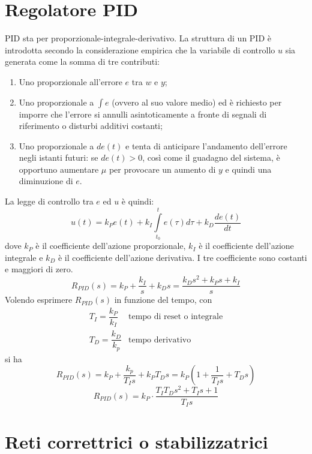 \documentclass[a4paper]{report}
\begin{document}
\section{Regolatore PID}
PID sta per proporzionale-integrale-derivativo. La struttura di un PID
\`e introdotta secondo la considerazione empirica che la variabile di
controllo $u$ sia generata come la somma di tre contributi:
\begin{enumerate}
\item Uno proporzionale all'errore $e$ tra $w$ e $y$;
\item Uno proporzionale a $\int e$ (ovvero al suo valore medio) ed \`e
  richiesto per imporre che l'errore si annulli asintoticamente a
  fronte di segnali di riferimento o disturbi additivi costanti;
\item Uno proporzionale a $de(t)$ e tenta di anticipare l'andamento
  dell'errore negli istanti futuri: se $de(t) > 0$, cos\`i come il
  guadagno del sistema, \`e opportuno aumentare $\mu$ per provocare un
  aumento di $y$ e quindi una diminuzione di $e$.
\end{enumerate}
La legge di controllo tra $e$ ed $u$ \`e quindi:
\[
u(t) = k_P e(t) + k_I\int\limits_{t_0}^{t} e(\tau) d\tau + k_D
\dfrac{de(t)}{dt}
\]
dove $k_P$ \`e il coefficiente dell'azione proporzionale, $k_I$ \`e il
coefficiente dell'azione integrale e $k_D$ \`e il coefficiente
dell'azione derivativa. I tre coefficiente sono costanti e maggiori di
zero.
\[
R_{PID}(s) = k_P + \dfrac{k_I}{s} + k_Ds = \dfrac{k_D s^2 + k_P s +
  k_I}{s} 
\]
Volendo esprimere $R_{PID}(s)$ in funzione del tempo, con
\[
\begin{array}{ll}
  T_I = \dfrac{k_P}{k_I} & \textrm{tempo di reset o integrale}\\
  T_D = \dfrac{k_D}{k_p} & \textrm{tempo derivativo}
\end{array}
\]
si ha
\[
R_{PID}(s) = k_P + \dfrac{k_p}{T_I s} + k_P T_D s = k_P (1 +
\dfrac{1}{T_I s} + T_D s)
\]
\begin{equation}
  R_{PID}(s) = k_P \cdot \dfrac{T_I T_D s^2 + T_I s + 1}{T_I s}
\end{equation}
\section{Reti correttrici o stabilizzatrici}
\end{document}

